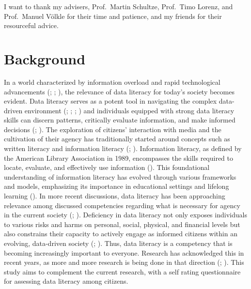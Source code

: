 \documentclass[
  12pt,
  a4paper,
  twoside]{article}
\begin{document}
I want to thank my advisers, Prof.~Martin Schultze, Prof.~Timo Lorenz, and Prof.~Manuel Völkle for their time and patience, and my friends for their resourceful advice.

\newpage\null\thispagestyle{empty}\newpage

\section{Background}\label{background}

In a world characterized by information overload and rapid technological advancements (; ; ), the relevance of data literacy for today's society becomes evident. Data literacy serves as a potent tool in navigating the complex data-driven environment (; ; ; ) and individuals equipped with strong data literacy skills can discern patterns, critically evaluate information, and make informed decisions (; ).
The exploration of citizens' interaction with media and the cultivation of their agency has traditionally started around concepts such as written literacy and information literacy (; ). Information literacy, as defined by the American Library Association in 1989, encompasses the skills required to locate, evaluate, and effectively use information (). This foundational understanding of information literacy has evolved through various frameworks and models, emphasizing its importance in educational settings and lifelong learning (). In more recent discussions, data literacy has been approaching relevance among discussed competencies regarding what is necessary for agency in the current society (; ). Deficiency in data literacy not only exposes individuals to various risks and harms on personal, social, physical, and financial levels but also constrains their capacity to actively engage as informed citizens within an evolving, data-driven society (; ). Thus, data literacy is a competency that is becoming increasingly important to everyone. Research has acknowledged this in recent years, as more and more research is being done in that direction (; ). This study aims to complement the current research, with a self rating questionnaire for assessing data literacy among citizens.
\end{document}
